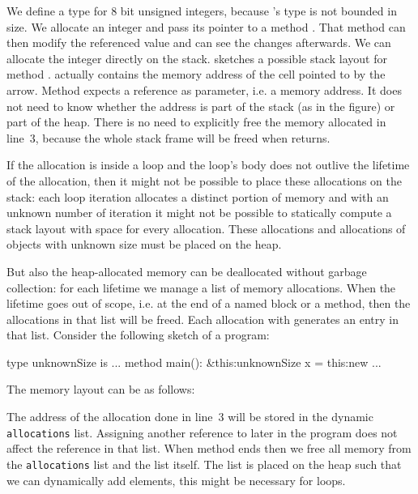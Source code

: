\noindent We define a type  for 8 bit unsigned integers, because \whiley's type  is not bounded in size.
We allocate an integer and pass its pointer  to a method .
That method can then modify the referenced value and  can see the changes afterwards.
We can allocate the integer directly on the stack.
 sketches a possible stack layout for method .
 actually contains the memory address of the cell pointed to by the arrow.
Method  expects a reference as parameter, i.e. a memory address.
It does not need to know whether the address is part of the stack (as in the figure) or part of the heap.
There is no need to explicitly free the memory allocated in line~3, because the whole stack frame will be freed when  returns.

If the allocation is inside a loop and the loop's body does not outlive the lifetime of the allocation, then it might not be possible to place these allocations on the stack:
each loop iteration allocates a distinct portion of memory and with an unknown number of iteration it might not be possible to statically compute a stack layout with space for every allocation.
These allocations and allocations of objects with unknown size must be placed on the heap.

But also the heap-allocated memory can be deallocated without garbage collection:
for each lifetime we manage a list of memory allocations.
When the lifetime goes out of scope, i.e. at the end of a named block or a method, then the allocations in that list will be freed.
Each allocation with  generates an entry in that list.
Consider the following sketch of a program:

\begin{whileycode}
type unknownSize is ...
method main():
	&this:unknownSize x = this:new ...
\end{whileycode}

\noindent The memory layout can be as follows:

\begin{figure}[!h]
\centering

\end{figure}

The address of the allocation done in line~3 will be stored in the dynamic \texttt{allocations} list.
Assigning another reference to  later in the program does not affect the reference in that list.
When method  ends then we free all memory from the \texttt{allocations} list and the list itself.
The list is placed on the heap such that we can dynamically add elements, this might be necessary for loops.

